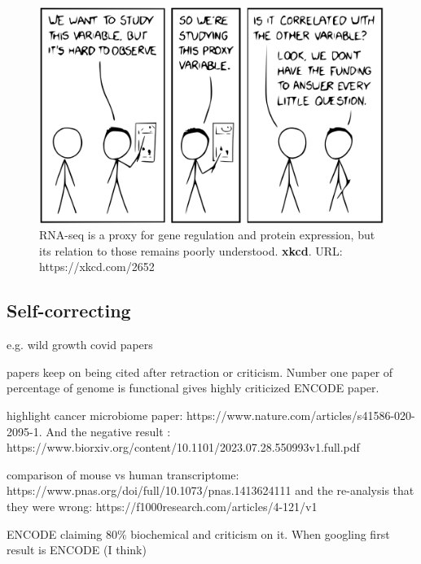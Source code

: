 \begin{figure}[H]
    \includegraphics[width=\linewidth]{ch.discussion/imgs/xkcd.png}
    \caption{RNA-seq is a proxy for gene regulation and protein expression, but its relation to those remains poorly understood. \textbf{xkcd}. URL: https://xkcd.com/2652}
    \label{fig:xkcd}
\end{figure}



\subsection{Self-correcting}

e.g. wild growth covid papers

papers keep on being cited after retraction or criticism. Number one paper of percentage of genome is functional gives highly criticized ENCODE paper.

highlight cancer microbiome paper: https://www.nature.com/articles/s41586-020-2095-1. And the negative result : https://www.biorxiv.org/content/10.1101/2023.07.28.550993v1.full.pdf

comparison of mouse vs human transcriptome: https://www.pnas.org/doi/full/10.1073/pnas.1413624111 and the re-analysis that they were wrong: https://f1000research.com/articles/4-121/v1

ENCODE claiming 80\% biochemical and criticism on it. When googling first result is ENCODE (I think)

